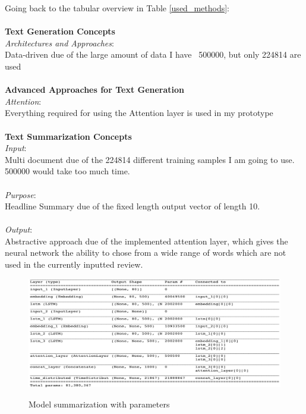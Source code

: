 \begin{tcolorbox}
	Going back to the tabular overview in Table \ref{used_methods}:\\\\
	\textbf{Text Generation Concepts} \\
	
	\textit{Architectures and Approaches}:\\ Data-driven due of the large amount of data I have ~500000, but only 224814 are used \\ \\
	
	\textbf{Advanced Approaches for Text Generation} \\
	
	\textit{Attention}: \\Everything required for using the Attention layer is used in my prototype\\ \\
	
	\textbf{Text Summarization Concepts} \\
	
	\textit{Input}: \\ Multi document due of the 224814 different training samples I am going to use. 500000 would take too much time. \\ \\
	\textit{Purpose}:\\ Headline Summary due of the fixed length output vector of length 10. \\ \\
	\textit{Output}: \\ Abstractive approach due of the implemented attention layer, which gives the neural network the ability to chose from a wide range of words which are not used in the currently inputted review.
\end{tcolorbox}


\begin{figure}
	\begin{center}
		\includegraphics[width=6in]{photos/model_sum}\\
		\caption{Model summarization with parameters}\label{model_sum}
	\end{center}
\end{figure}


